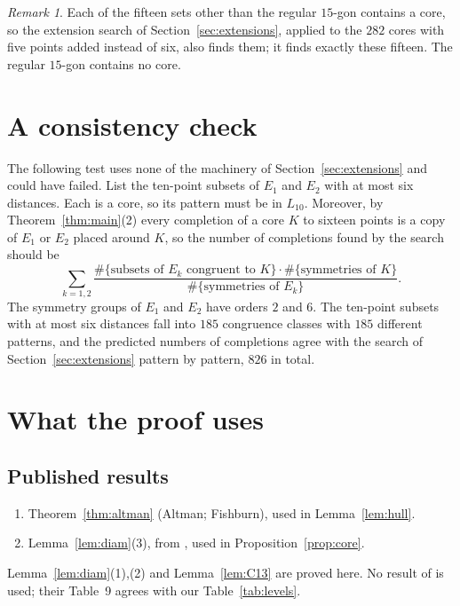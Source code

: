 \documentclass[11pt]{amsart}
\theoremstyle{definition}
\theoremstyle{remark}
\newtheorem{remark}[theorem]{Remark}
\begin{document}
\begin{remark}
Each of the fifteen sets other than the regular $15$-gon contains a core, so the extension search of
Section~\ref{sec:extensions}, applied to the $282$ cores with five points added instead of six, also finds them;
it finds exactly these fifteen. The regular $15$-gon contains no core.
\end{remark}

\section{A consistency check}\label{sec:check}

The following test uses none of the machinery of Section~\ref{sec:extensions} and could have failed. List the
ten-point subsets of $E_1$ and $E_2$ with at most six distances. Each is a core, so its pattern must be in
$L_{10}$. Moreover, by Theorem~\ref{thm:main}(2) every completion of a core $K$ to sixteen points is a copy of
$E_1$ or $E_2$ placed around $K$, so the number of completions found by the search should be
\[
  \sum_{k=1,2}\frac{\#\{\text{subsets of }E_k\text{ congruent to }K\}\cdot\#\{\text{symmetries of }K\}}
  {\#\{\text{symmetries of }E_k\}}.
\]
The symmetry groups of $E_1$ and $E_2$ have orders $2$ and $6$. The ten-point subsets with at most six
distances fall into $185$ congruence classes with $185$ different patterns, and the predicted numbers of
completions agree with the search of Section~\ref{sec:extensions} pattern by pattern, $826$ in total.

\section{What the proof uses}\label{sec:computation}

\subsection*{Published results}
\begin{enumerate}
\item Theorem~\ref{thm:altman} (Altman; Fishburn), used in Lemma~\ref{lem:hull}.
\item Lemma~\ref{lem:diam}(3), from \cite[Lemmas 3--5 and 9]{W}, used in Proposition~\ref{prop:core}.
\end{enumerate}
Lemma~\ref{lem:diam}(1),(2) and Lemma~\ref{lem:C13} are proved here. No result of \cite{SO} is used; their
Table~9 agrees with our Table~\ref{tab:levels}.
\end{document}
